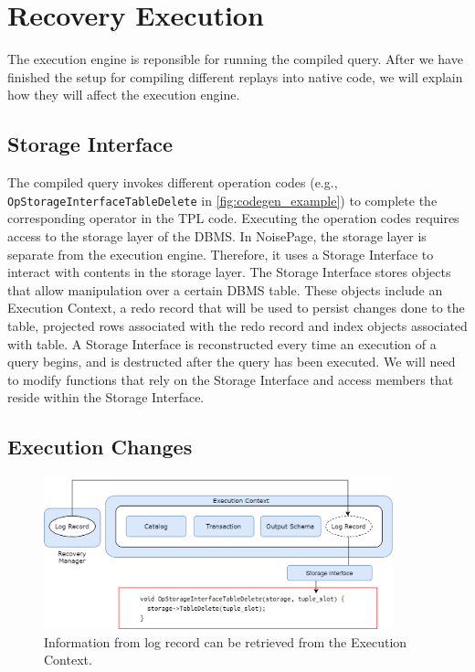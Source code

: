 \documentclass[12pt]{cmuthesis}
\begin{document}
\section{Recovery Execution}
The execution engine is reponsible for running the compiled query. After we have finished the setup for compiling different replays into native code, we will explain how they will affect the execution engine.

\subsection{Storage Interface}
The compiled query invokes different operation codes (e.g., \texttt{OpStorageInterfaceTableDelete} in \cref{fig:codegen_example}) to complete the corresponding operator in the TPL code. Executing the operation codes requires access to the storage layer of the DBMS. In NoisePage, the storage layer is separate from the execution engine. Therefore, it uses a Storage Interface to interact with contents in the storage layer. The Storage Interface stores objects that allow manipulation over a certain DBMS table. These objects include an Execution Context, a redo record that will be used to persist changes done to the table, projected rows associated with the redo record and index objects associated with table. A Storage Interface is reconstructed every time an execution of a query begins, and is destructed after the query has been executed. We will need to modify functions that rely on the Storage Interface and access members that reside within the Storage Interface.

\subsection{Execution Changes}
\begin{figure}[t!]
\centering
\includegraphics[width=0.9\textwidth]{images/RecoveryExecution.png}
\caption{Information from log record can be retrieved from the Execution Context.}
\label{fig:recovery_execution}
\end{figure}
\end{document}
